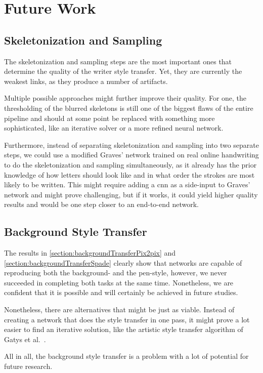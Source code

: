 \chapter{Future Work}\label{chapter:futureWork}

\section{Skeletonization and Sampling}
The skeletonization and sampling steps are the most important ones that determine the quality of the writer style transfer. Yet, they are currently the weakest links, as they produce a number of artifacts.

Multiple possible approaches might further improve their quality. For one, the thresholding of the blurred skeletons is still one of the biggest flaws of the entire pipeline and should at some point be replaced with something more sophisticated, like an iterative solver or a more refined neural network.

Furthermore, instead of separating skeletonization and sampling into two separate steps, we could use a modified Graves' network trained on real online handwriting to do the skeletonization and sampling simultaneously, as it already has the prior knowledge of how letters should look like and in what order the strokes are most likely to be written. This might require adding a \gls{cnn} as a side-input to Graves' network and might prove challenging, but if it works, it could yield higher quality results and would be one step closer to an end-to-end network.

\section{Background Style Transfer}
The results in \cref{section:backgroundTransferPix2pix} and \cref{section:backgroundTransferSpade} clearly show that networks are capable of reproducing both the background- and the pen-style, however, we never succeeded in completing both tasks at the same time. Nonetheless, we are confident that it is possible and will certainly be achieved in future studies.

Nonetheless, there are alternatives that might be just as viable. Instead of creating a network that does the style transfer in one pass, it might prove a lot easier to find an iterative solution, like the artistic style transfer algorithm of Gatys et al.~\cite{iterativeArtisticStyleTransfer}.

All in all, the background style transfer is a problem with a lot of potential for future research.

